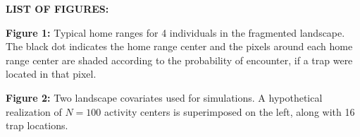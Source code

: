 \documentclass[12pt]{article}
\begin{document}

\newpage

{\flushleft \bf LIST OF FIGURES:}

\vspace{.2in}


{\flushleft \bf
Figure 1:}
Typical home ranges for 4 individuals in the fragmented landscape. %
The black dot indicates the home
  range center and the pixels around each home range center are shaded
according to the probability of encounter, if a trap were located in
that pixel.



\vspace{.2in}


{\flushleft \bf Figure 2:}
Two landscape covariates used for simulations. A hypothetical
  realization of $N=100$ activity centers is superimposed on the left,
along with 16 trap locations.


\newpage


\end{document}
